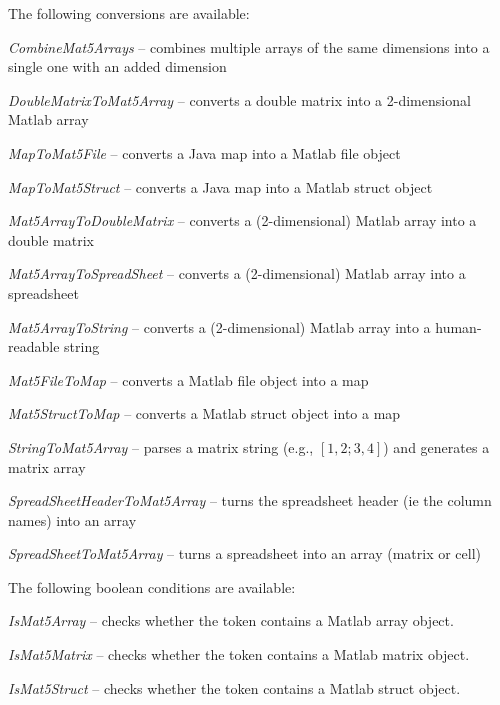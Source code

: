 \documentclass[a4paper]{book}
\begin{document}
The following conversions are available:
\begin{tight_itemize}
  \item \textit{CombineMat5Arrays} -- combines multiple arrays of the same dimensions into a single one with an added dimension
  \item \textit{DoubleMatrixToMat5Array} -- converts a double matrix into a 2-dimensional Matlab array
  \item \textit{MapToMat5File} -- converts a Java map into a Matlab file object
  \item \textit{MapToMat5Struct} -- converts a Java map into a Matlab struct object
  \item \textit{Mat5ArrayToDoubleMatrix} -- converts a (2-dimensional) Matlab array into a double matrix
  \item \textit{Mat5ArrayToSpreadSheet} -- converts a (2-dimensional) Matlab array into a spreadsheet
  \item \textit{Mat5ArrayToString} -- converts a (2-dimensional) Matlab array into a human-readable string
  \item \textit{Mat5FileToMap} -- converts a Matlab file object into a map
  \item \textit{Mat5StructToMap} -- converts a Matlab struct object into a map
  \item \textit{StringToMat5Array} -- parses a matrix string (e.g., $[1, 2; 3, 4]$) and generates a matrix array
  \item \textit{SpreadSheetHeaderToMat5Array} -- turns the spreadsheet header (ie the column names) into an array
  \item \textit{SpreadSheetToMat5Array} -- turns a spreadsheet into an array (matrix or cell)
\end{tight_itemize}

The following boolean conditions are available:
\begin{tight_itemize}
  \item \textit{IsMat5Array} -- checks whether the token contains a Matlab array object.
  \item \textit{IsMat5Matrix} -- checks whether the token contains a Matlab matrix object.
  \item \textit{IsMat5Struct} -- checks whether the token contains a Matlab struct object.
\end{tight_itemize}



\end{document}
